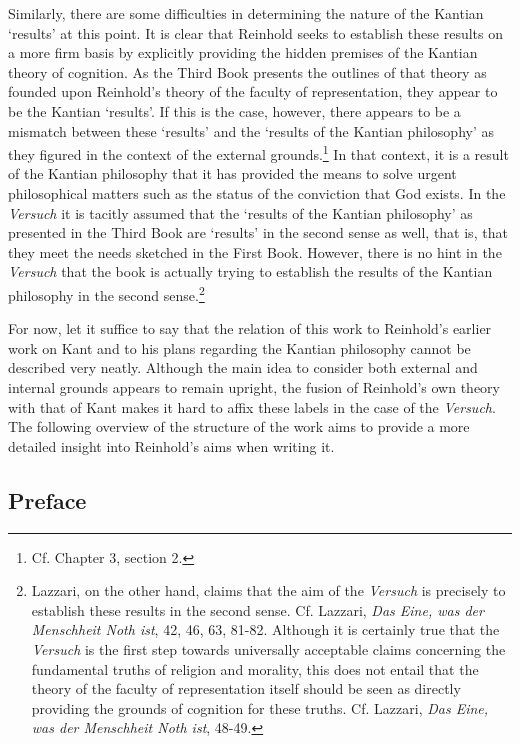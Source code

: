 Similarly, there are some difficulties in determining the nature of the Kantian `results' at this point. It is clear that Reinhold seeks to establish these results on a more firm basis by explicitly providing the hidden premises of the Kantian theory of cognition. As the Third Book presents the outlines of that theory as founded upon Reinhold's theory of the faculty of representation, they appear to be the Kantian `results'. If this is the case, however, there appears to be a mismatch between these `results' and the `results of the Kantian philosophy' as they figured in the context of the external grounds.\footnote{ Cf. Chapter 3, section 2. } In that context, it is a result of the Kantian philosophy that it has provided the means to solve urgent philosophical matters such as the status of the conviction that God exists. In the \textit{Versuch} it is tacitly assumed that the `results of the Kantian philosophy' as presented in the Third Book are `results' in the second sense as well, that is, that they meet the needs sketched in the First Book. However, there is no hint in the \textit{Versuch} that the book is actually trying to establish the results of the Kantian philosophy in the second sense.\footnote{\label{footnote:_Ref229216414} Lazzari, on the other hand, claims that the aim of the \textit{Versuch }is precisely to establish these results in the second sense. Cf. Lazzari, \textit{Das Eine, was der Menschheit Noth ist}, 42, 46, 63, 81{-}82. Although it is certainly true that the \textit{Versuch} is the first step towards universally acceptable claims concerning the fundamental truths of religion and morality, this does not entail that the theory of the faculty of representation itself should be seen as directly providing the grounds of cognition for these truths. Cf. Lazzari, \textit{Das Eine, was der Menschheit Noth ist}, 48{-}49. }

For now, let it suffice to say that the relation of this work to Reinhold's earlier work on Kant and to his plans regarding the Kantian philosophy cannot be described very neatly. Although the main idea to consider both external and internal grounds appears to remain upright, the fusion of Reinhold's own theory with that of Kant makes it hard to affix these labels in the case of the \textit{Versuch}. The following overview of the structure of the work aims to provide a more detailed insight into Reinhold's aims when writing it. 


\subsection{Preface}



